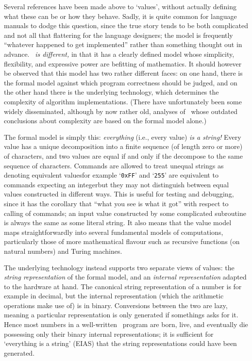 \documentclass{mtmtcl}
\theoremstyle{plain}
\theoremstyle{remark}
\begin{document}
Several references have been made above to `values', without actually 
defining what these can be or how they behave. Sadly, it is quite 
common for language manuals to dodge this question, since the true 
story tends to be both complicated and not all that flattering for 
the language designers; the model is frequently ``whatever happened 
to get implemented'' rather than something thought out in advance. 
\emph{\Tcl\ is different,} in that it has a clearly defined model 
whose simplicity, flexibility, and expressive power are befitting of 
mathematics. It should however be observed that this model has two 
rather different faces: on one hand, there is the formal model 
against which program correctness should be judged, and on the other 
hand there is the underlying technology, which determines the 
complexity of algorithm implementations. (There have unfortunately 
been some widely disseminated, although by now rather old, analyses 
of \Tcl\ whose outdated conclusions about complexity are based on 
the formal model alone.)

The formal model is simply this: \emph{everything} (i.e., every 
value) \emph{is a string!} Every value has a unique decomposition 
into a finite sequence (of length zero or more) of characters, and 
two values are equal if and only if the decompose to the same 
sequence of characters. Commands are allowed to treat unequal 
strings as denoting equivalent values\Ldash for example 
`\texttt{0xFF}' and `\texttt{255}' are equivalent to commands 
expecting an integer\Rdash but they may not distinguish between equal 
values constructed in different ways. This is useful for testing and 
debugging, since it has the corollary that ``what you see is what it 
got'' with respect to calling of commands; an input value constructed 
by some complicated subroutine is always the same as some literal 
string. It also means that the value model maps 
straightforwardly into several fundamental models of computations, 
particularly those of more mathematical flavour such as 
recursive functions (on natural numbers) and Turing machines.

The underlying technology instead supports two separate views of 
values: the \emph{string representation} of the formal model, and an 
\emph{internal representation} adapted to the hardware at hand. The 
canonical string representation of a number is for example in 
decimal, but the internal representation (which the arithmetic 
operations make use of) is in binary. Conversions between the two are 
lazy, meaning a particular representation is only generated if 
somethings asks for it. Hence most numbers in a well-written \Tcl\ 
program are born, live, and eventually die possessing only their 
binary internal representations; it is sufficient for `everything is 
a string' (EIAS) that the string representations could have been 
generated.
\end{document}
